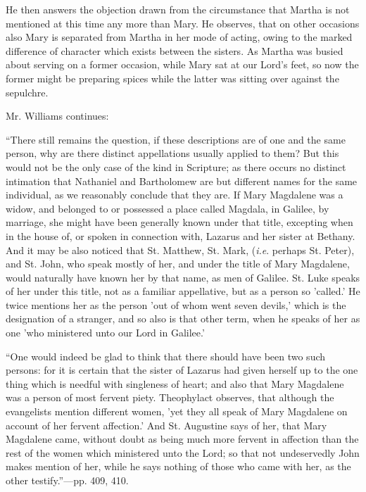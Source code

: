 He then answers the objection drawn from the
circumstance that Martha is not mentioned at this time any more than
Mary. He observes, that on other occasions also Mary is separated from
Martha in her mode of acting, owing to the marked difference of
character which exists between the sisters. As Martha was busied about
serving on a former occasion, while Mary sat at our Lord's feet, so now
the former might be preparing spices while the latter was sitting over
against the sepulchre.

Mr. Williams continues:

``There still remains the question,
if these descriptions are of one and the same person, why are there
distinct appellations usually applied to them? But this would not be the
only case of the kind in Scripture; as there occurs no distinct
intimation that Nathaniel and Bartholomew are but different names for
the same individual, as we reasonably conclude that they are. If Mary
Magdalene was a widow, and belonged to or possessed a place called
Magdala, in Galilee, by marriage, she might have been generally known
under that title, excepting when in the house of, or spoken in
connection with, Lazarus and her sister at Bethany.
And it may be also noticed that St. Matthew, St. Mark, (\emph{i.e}.
perhaps St. Peter), and St. John, who speak mostly of her, and under the
title of Mary Magdalene, would naturally have known her by that name, as
men of Galilee. St. Luke speaks of her under this title, not as a
familiar appellative, but as a person so 'called.' He twice mentions her
as the person 'out of whom went seven devils,' which is the designation
of a stranger, and so also is that other term, when he speaks of her as
one 'who ministered unto our Lord in Galilee.'

``One would indeed be glad to think
that there should have been two such persons: for it is certain that the
sister of Lazarus had given herself up to the one thing which is needful
with singleness of heart; and also that Mary Magdalene was a person of
most fervent piety. Theophylact observes, that although the evangelists
mention different women, 'yet they all speak of Mary Magdalene on
account of her fervent affection.' And St. Augustine says of her, that
Mary Magdalene came, without doubt as being much more fervent in
affection than the rest of the women which ministered unto the Lord; so
that not undeservedly John makes mention of her, while he says nothing
of those who came with her, as the other testify.''—pp. 409, 410.

